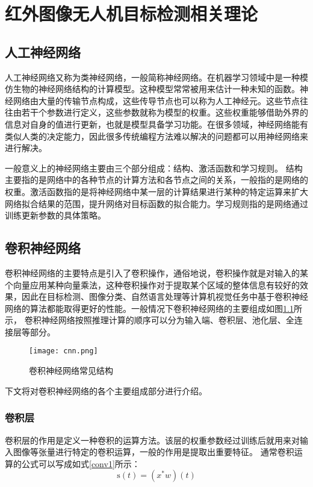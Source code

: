 \chapter{红外图像无人机目标检测相关理论}

\section{人工神经网络}
人工神经网络又称为类神经网络，一般简称神经网络。在机器学习领域中是一种模仿生物的神经网络结构的计算模型。这种模型常常被用来估计一种未知的函数。神经网络由大量的传输节点构成，这些传导节点也可以称为人工神经元。这些节点往往由若干个参数进行定义，这些参数就称为模型的权重。这些权重能够借助外界的信息对自身的值进行更新，也就是模型具备学习功能。在很多领域，神经网络能有类似人类的决定能力，因此很多传统编程方法难以解决的问题都可以用神经网络来进行解决。

一般意义上的神经网络主要由三个部分组成：结构、激活函数和学习规则。
结构主要指的是网络中的各种节点的计算方法和各节点之间的关系，一般指的是网络的权重。激活函数指的是将神经网络中某一层的计算结果进行某种的特定运算来扩大网络拟合结果的范围，提升网络对目标函数的拟合能力。学习规则指的是网络通过训练更新参数的具体策略。

\section{卷积神经网络}
卷积神经网络的主要特点是引入了卷积操作，通俗地说，卷积操作就是对输入的某个向量应用某种向量乘法，这种卷积操作对于提取某个区域的整体信息有较好的效果，因此在目标检测、图像分类、自然语言处理等计算机视觉任务中基于卷积神经网络的算法都能取得更好的性能。一般情况下卷积神经网络的主要组成如图\ref{cnn}所示，
卷积神经网络按照推理计算的顺序可以分为输入端、卷积层、池化层、全连接层等部分。

\begin{figure}[htbp]
    \centering
    \texttt{[image: cnn.png]}
    \caption{卷积神经网络常见结构}
    \label{cnn}
\end{figure}

下文将对卷积神经网络的各个主要组成部分进行介绍。

\subsection{卷积层}
卷积层的作用是定义一种卷积的运算方法。该层的权重参数经过训练后就用来对输入图像等张量进行特定的卷积运算，一般的作用是提取出重要特征。
通常卷积运算的公式可以写成如式\ref{conv1}所示：
\begin{equation}
    \mathrm{s}(t)=\left(x^{*} w\right)(t)
    \label{conv1}
\end{equation}

